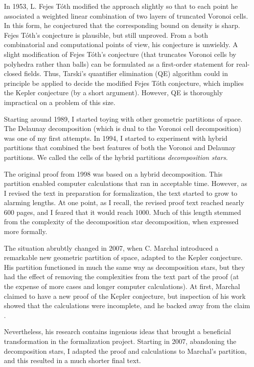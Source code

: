 \documentclass{amsart}
\begin{document}
In 1953, L. Fejes T\'oth modified the approach slightly so that to
each point he associated a weighted linear combination of two layers
of truncated Voronoi cells.  In this form, he conjectured that the
corresponding bound on density is sharp.  Fejes T\'oth's conjecture is
plausible, but still unproved.  From a both combinatorial and
computational points of view, his conjecture is unwieldy.  A slight
modification of Fejes T\'oth's conjecture (that truncates Voronoi
cells by polyhedra rather than balls) can be formulated as a
first-order statement for real-closed fields.  Thus, Tarski's
quantifier elimination (QE) algorithm could in principle be applied to
decide the modified Fejes T\'oth conjecture, which implies the Kepler
conjecture (by a short argument).  However, QE is thoroughly
impractical on a problem of this size.

Starting around 1989, I started toying with other geometric partitions
of space.  The Delaunay decomposition (which is dual to the Voronoi
cell decomposition) was one of my first attempts.  In 1994, I started
to experiment with hybrid partitions that combined the best features
of both the Voronoi and Delaunay partitions.  We called the cells of
the hybrid partitions \emph{decomposition stars}.  

The original proof from 1998 was based on a hybrid decomposition.  This
partition enabled computer calculations that ran in acceptable time.
However, as I revised the text in preparation for formalization, the text
started to grow to alarming lengths.  At one point, as I recall, the
revised proof text reached nearly 600 pages, and I feared that it would
reach 1000.  Much of this length stemmed from the complexity of the
decomposition star decomposition, when expressed more formally.

The situation abrubtly changed in 2007, when C. Marchal introduced a
remarkable new geometric partition of space, adapted to the Kepler
conjecture.  His partition functioned in much the same way as
decomposition stars, but they had the effect of removing the
complexities from the text part of the proof (at the expense of more
cases and longer computer calculations).  At first, Marchal claimed to
have a new proof of the Kepler conjecture, but inspection of his work
showed that the calculations were incomplete, and he backed away from
the claim \cite{marchal:2007}.

Nevertheless, his research contains ingenious ideas that brought a
beneficial transformation in the formalization project.  Starting in
2007, abandoning the decomposition stars, I adapted the proof and
calculations to Marchal's partition, and this resulted in a much
shorter final text.
\end{document}
